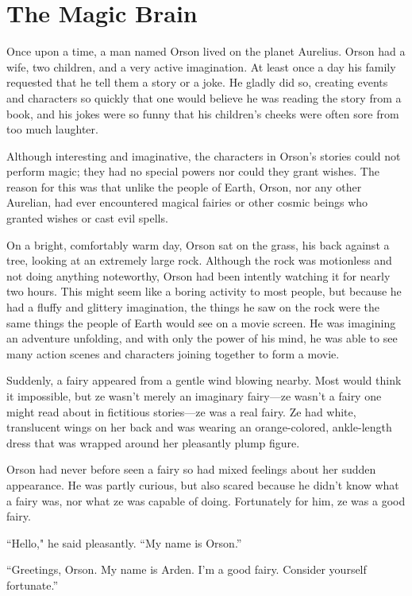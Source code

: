 \chapter{The Magic Brain}

Once upon a time, a man named Orson lived on the planet Aurelius. Orson had a wife, two children, and a very active imagination. At least once a day his family requested that he tell them a story or a joke. He gladly did so, creating events and characters so quickly that one would believe he was reading the story from a book, and his jokes were so funny that his children's cheeks were often sore from too much laughter.

Although interesting and imaginative, the characters in Orson's stories could not perform magic; they had no special powers nor could they grant wishes. The reason for this was that unlike the people of Earth, Orson, nor any other Aurelian, had ever encountered magical fairies or other cosmic beings who granted wishes or cast evil spells.

\timesep

On a bright, comfortably warm day, Orson sat on the grass, his back against a tree, looking at an extremely large rock. Although the rock was motionless and not doing anything noteworthy, Orson had been intently watching it for nearly two hours. This might seem like a boring activity to most people, but because he had a fluffy and glittery imagination, the things he saw on the rock were the same things the people of Earth would see on a movie screen. He was imagining an adventure unfolding, and with only the power of his mind, he was able to see many action scenes and characters joining together to form a movie.

Suddenly, a fairy appeared from a gentle wind blowing nearby. Most would think it impossible, but ze wasn't merely an imaginary fairy—ze wasn't a fairy one might read about in fictitious stories—ze was a real fairy. Ze had white, translucent wings on her back and was wearing an orange-colored, ankle-length dress that was wrapped around her pleasantly plump figure.

Orson had never before seen a fairy so had mixed feelings about her sudden appearance. He was partly curious, but also scared because he didn't know what a fairy was, nor what ze was capable of doing. Fortunately for him, ze was a good fairy.

“Hello," he said pleasantly. “My name is Orson.”

“Greetings, Orson. My name is Arden. I'm a good fairy. Consider yourself fortunate.”

